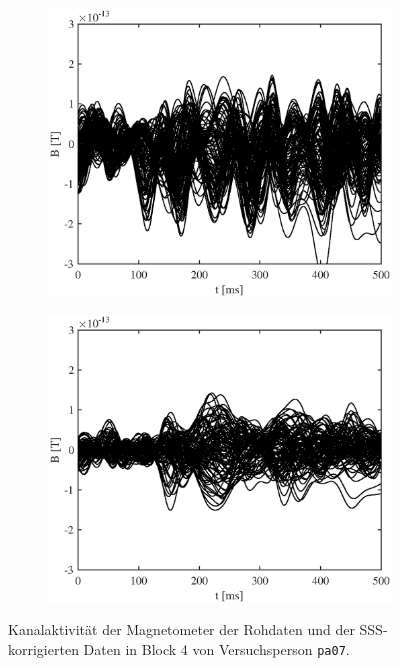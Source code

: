\documentclass[doc,a4paper,12pt]{apa6}
\begin{document}
\begin{figure}
  \captionsetup{justification=centering}
  \begin{subfigure}[c]{0.47\textwidth}
    \includegraphics[width=\textwidth]{ergebnisse/pa07/pa07a4_eve2_raw_mag_butterfly.eps}
    \label{img:butterfly:pa07:4:raw}
  \end{subfigure}\hspace*{0.04\textwidth}
  \begin{subfigure}[c]{0.47\textwidth}
    \includegraphics[width=\textwidth]{ergebnisse/pa07/pa07a4_eve2_sss_mag_butterfly.eps}
    \label{img:butterfly:pa07:4:sss}
  \end{subfigure}
  \captionsetup{justification=justified}
  \vspace*{3mm}
  \caption{Kanalaktivität der Magnetometer der Rohdaten und der SSS-korrigierten Daten in Block 4 von Versuchsperson \texttt{pa07}.}
  \label{img:butterfly:pa07:4}
\end{figure}
\end{document}
